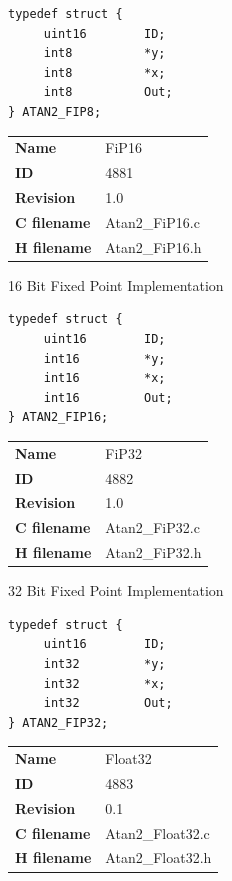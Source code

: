 \begin{lstlisting}
typedef struct {
     uint16        ID;
     int8          *y;
     int8          *x;
     int8          Out;
} ATAN2_FIP8;
\end{lstlisting}

\ifdefined \AddTestReports
{}
\fi
{}
\nopagebreak[0]
\begin{tabular}{l l}
\textbf{Name} & FiP16 \tabularnewline
\textbf{ID} & 4881 \tabularnewline
\textbf{Revision} & 1.0 \tabularnewline
\textbf{C filename} & Atan2\_FiP16.c \tabularnewline
\textbf{H filename} & Atan2\_FiP16.h \tabularnewline
\end{tabular}
\vspace{1ex}

16 Bit Fixed Point Implementation

\begin{lstlisting}
typedef struct {
     uint16        ID;
     int16         *y;
     int16         *x;
     int16         Out;
} ATAN2_FIP16;
\end{lstlisting}

\ifdefined \AddTestReports
{}
\fi
{}
\nopagebreak[0]
\begin{tabular}{l l}
\textbf{Name} & FiP32 \tabularnewline
\textbf{ID} & 4882 \tabularnewline
\textbf{Revision} & 1.0 \tabularnewline
\textbf{C filename} & Atan2\_FiP32.c \tabularnewline
\textbf{H filename} & Atan2\_FiP32.h \tabularnewline
\end{tabular}
\vspace{1ex}

32 Bit Fixed Point Implementation

\begin{lstlisting}
typedef struct {
     uint16        ID;
     int32         *y;
     int32         *x;
     int32         Out;
} ATAN2_FIP32;
\end{lstlisting}

\ifdefined \AddTestReports
{}
\fi
{}
\nopagebreak[0]
\begin{tabular}{l l}
\textbf{Name} & Float32 \tabularnewline
\textbf{ID} & 4883 \tabularnewline
\textbf{Revision} & 0.1 \tabularnewline
\textbf{C filename} & Atan2\_Float32.c \tabularnewline
\textbf{H filename} & Atan2\_Float32.h \tabularnewline
\end{tabular}
\vspace{1ex}

